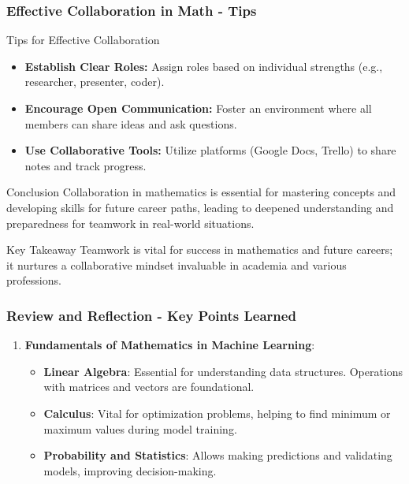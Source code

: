 \documentclass[aspectratio=169]{beamer}
\begin{document}
\begin{frame}[fragile]
    \frametitle{Effective Collaboration in Math - Tips}
    
    \begin{block}{Tips for Effective Collaboration}
        \begin{itemize}
            \item \textbf{Establish Clear Roles:} Assign roles based on individual strengths (e.g., researcher, presenter, coder).
            \item \textbf{Encourage Open Communication:} Foster an environment where all members can share ideas and ask questions.
            \item \textbf{Use Collaborative Tools:} Utilize platforms (Google Docs, Trello) to share notes and track progress.
        \end{itemize}
    \end{block}

    \begin{block}{Conclusion}
        Collaboration in mathematics is essential for mastering concepts and developing skills for future career paths, leading to deepened understanding and preparedness for teamwork in real-world situations.
    \end{block}
    
    \begin{block}{Key Takeaway}
        Teamwork is vital for success in mathematics and future careers; it nurtures a collaborative mindset invaluable in academia and various professions.
    \end{block}
\end{frame}

\begin{frame}[fragile]
    \frametitle{Review and Reflection - Key Points Learned}
    
    \begin{enumerate}
        \item \textbf{Fundamentals of Mathematics in Machine Learning}:
        \begin{itemize}
            \item \textbf{Linear Algebra}: Essential for understanding data structures. Operations with matrices and vectors are foundational.
            \item \textbf{Calculus}: Vital for optimization problems, helping to find minimum or maximum values during model training.
            \item \textbf{Probability and Statistics}: Allows making predictions and validating models, improving decision-making.
        \end{itemize}
    \end{enumerate}
\end{frame}
\end{document}
